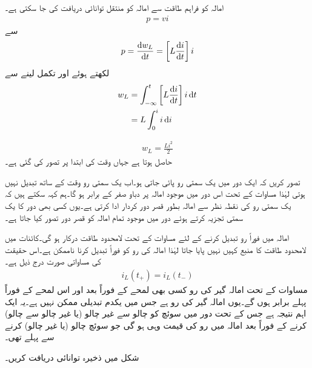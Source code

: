 امالہ کو فراہم طاقت سے امالہ کو منتقل توانائی  دریافت کی جا سکتی ہے۔
\begin{align}
p=vi
\end{align}
سے
\begin{align}\label{مساوات_امالہ_کو_مہیا_طاقت_الف}
p=\frac{\dif w_L}{\dif t}=\left[L \frac{\dif i}{\dif t}\right] i
\end{align}
لکھتے ہوئے اور تکمل لینے سے
\begin{align*}
w_L&=\int_{-\infty}^{t} \left[L\frac{\dif i}{\dif t}\right]i\dif t\\
&=L\int_{0}^{i} i \dif i
\end{align*}

\begin{align}
w_L=\frac{Li^2}{2}
\end{align}
حاصل ہوتا ہے جہاں وقت کی ابتدا  پر  تصور کی گئی ہے۔

تصور کریں کہ ایک دور میں یک سمتی رو پائی جاتی ہو۔اب یک سمتی رو وقت کے ساتھ تبدیل نہیں ہوتی لہٰذا مساوات  کے تحت اس دور میں موجود امالہ پر دباو صفر کے برابر ہو گا۔ہم کہہ سکتے ہیں کہ یک سمتی رو کی نقطہ نظر سے امالہ بطور قصر دور کردار ادا کرتی ہے۔یوں کسی بھی دور کا یک سمتی تجزیہ کرتے ہوئے دور میں موجود تمام امالہ کو قصر دور تصور کیا جاتا ہے۔

امالہ میں فوراً رو تبدیل کرنے کے لئے مساوات  کے تحت  لامحدود طاقت درکار ہو گی۔کائنات میں لامحدود طاقت کا منبع کہیں نہیں پایا جاتا لہٰذا امالہ کی رو کو فوراً تبدیل کرنا ناممکن ہے۔اس حقیقت کی مساواتی صورت درج ذیل ہے۔
\begin{align}\label{مساوات_امالہ_امالہ_گیر_رو_بلا_جوڑ_ہے}
i_L(t_+)=i_L(t_-)
\end{align}
مساوات  کے تحت امالہ گیر کی رو کسی بھی لمحے  کے فوراً بعد  اور اس لمحے کے فوراً  پہلے  برابر ہوں گے۔یوں امالہ گیر کی رو  ہے جس میں  یکدم تبدیلی ممکن نہیں ہے۔یہ ایک اہم نتیجہ ہے جس کے تحت دور میں سوئچ کو چالو سے غیر چالو (یا غیر چالو سے چالو) کرنے کے فوراً بعد امالہ میں رو کی قیمت وہی ہو گی جو سوئچ چالو (یا غیر چالو) کرنے سے پہلے تھی۔

شکل  میں ذخیرہ توانائی دریافت کریں۔

